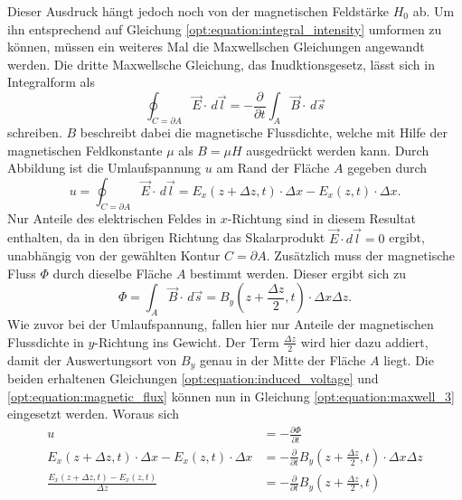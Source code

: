 Dieser Ausdruck hängt jedoch noch von der magnetischen Feldstärke $H_0$ ab.
Um ihn entsprechend auf Gleichung \eqref{opt:equation:integral_intensity} umformen zu können, müssen ein weiteres Mal die Maxwellschen Gleichungen angewandt werden.
Die dritte Maxwellsche Gleichung, das Inudktionsgesetz, lässt sich in Integralform als
\begin{equation}
\oint_{C=\partial A} \vec{E} \cdot\, d\vec{l}
=
-\frac{\partial}{\partial t} \int_{A} \vec{B} \cdot\, d\vec{s}
\label{opt:equation:maxwell_3}
\end{equation}
schreiben.
$B$ beschreibt dabei die magnetische Flussdichte, welche mit Hilfe der magnetischen Feldkonstante $\mu$ als $B = \mu H$ ausgedrückt werden kann.
Durch Abbildung  ist die Umlaufspannung $u$ am Rand der Fläche $A$ gegeben durch
\begin{equation}
u
=
\oint_{C=\partial A} \vec{E} \cdot\, d\vec{l}
=
E_x(z+\Delta z,t) \cdot \Delta x - E_x(z,t) \cdot \Delta x
.
\label{opt:equation:induced_voltage}
\end{equation}
Nur Anteile des elektrischen Feldes in $x$-Richtung sind in diesem Resultat enthalten, da in den übrigen Richtung das Skalarprodukt $\vec{E} \cdot d\vec{l} = 0$ ergibt, unabhängig von der gewählten Kontur $C = \partial A$.
Zusätzlich muss der magnetische Fluss $\Phi$ durch dieselbe Fläche $A$ bestimmt werden.
Dieser ergibt sich zu
\begin{equation}
\Phi
=
\int_{A} \vec{B} \cdot\, d\vec{s}
=
B_y\left(z+\frac{\Delta z}{2},t\right) \cdot \Delta x \Delta z
.
\label{opt:equation:magnetic_flux}
\end{equation}
Wie zuvor bei der Umlaufspannung, fallen hier nur Anteile der magnetischen Flussdichte in $y$-Richtung ins Gewicht.
Der Term $\frac{\Delta z}{2}$ wird hier dazu addiert, damit der Auswertungsort von $B_y$ genau in der Mitte der Fläche $A$ liegt.
Die beiden erhaltenen Gleichungen \eqref{opt:equation:induced_voltage} und \eqref{opt:equation:magnetic_flux} können nun in Gleichung \eqref{opt:equation:maxwell_3} eingesetzt werden.
Woraus sich
\begin{align*}
u
&=
-\frac{\partial\Phi}{\partial t}
\\
E_x(z+\Delta z,t) \cdot \Delta x - E_x(z,t) \cdot \Delta x
&=
-\frac{\partial}{\partial t} B_y\left(z+\frac{\Delta z}{2},t\right) \cdot \Delta x \Delta z
\\
\frac{E_x(z+\Delta z,t) - E_x(z,t)}{\Delta z}
&=
-\frac{\partial}{\partial t} B_y\left(z+\frac{\Delta z}{2},t\right)
\end{align*}
